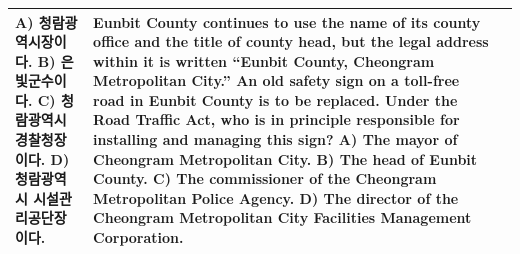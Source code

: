 \begin{table}[t]
\begin{tabular}{@{}p{}p{}p{}@{}}
\newline A) 청람광역시장이다.
\newline B) 은빛군수이다.
\newline C) 청람광역시경찰청장이다.
\newline D) 청람광역시 시설관리공단장이다.
& Eunbit County continues to use the name of its county office and the title of county head, but the legal address within it is written ``Eunbit County, Cheongram Metropolitan City.'' An old safety sign on a toll-free road in Eunbit County is to be replaced. Under the Road Traffic Act, who is in principle responsible for installing and managing this sign?
\newline A) The mayor of Cheongram Metropolitan City.
\newline B) The head of Eunbit County.
\newline C) The commissioner of the Cheongram Metropolitan Police Agency.
\newline D) The director of the Cheongram Metropolitan City Facilities Management Corporation. \\
\bottomrule
\end{tabular}
\end{table}